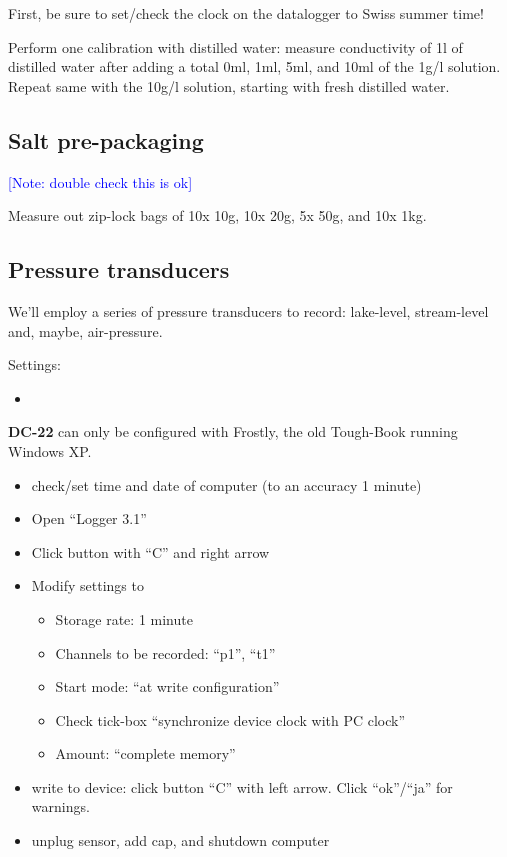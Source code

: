 \documentclass[DIV=15,halfparskip,11pt,headinclude]{scrartcl}
\newcommand{\note}[1]{\textcolor{blue}{[Note: #1]}}
\newcommand{\note}[1]{}
\begin{document}
First, be sure to set/check the clock on the datalogger to Swiss
summer time!

Perform one calibration with distilled water: measure conductivity of
1l of distilled water after adding a total 0ml, 1ml, 5ml, and 10ml of
the 1g/l solution.  Repeat same with the 10g/l solution, starting with
fresh distilled water.

\subsection{Salt pre-packaging}
\note{double check this is ok}

Measure out zip-lock bags of 10x 10g, 10x 20g, 5x 50g, and 10x 1kg.

\subsection{Pressure transducers}
\label{s:press-trans}

We'll employ a series of pressure transducers to record: lake-level,
stream-level and, maybe, air-pressure.

Settings:
\begin{itemize}
\item
\end{itemize}

\textbf{DC-22} can only be configured with Frostly, the old Tough-Book
running Windows XP.
\begin{itemize}
  \item check/set time and date of computer (to an accuracy 1 minute)
\item Open ``Logger 3.1''
\item Click button with ``C'' and right arrow
\item Modify settings to
\begin{itemize}
\item Storage rate: 1 minute
\item Channels to be recorded: ``p1'', ``t1''
\item Start mode: ``at write configuration''
\item Check tick-box ``synchronize device clock with PC clock''
\item Amount: ``complete memory''
\end{itemize}
\item write to device: click button ``C'' with left arrow.  Click
  ``ok''/``ja'' for warnings.
  \item unplug sensor, add cap, and shutdown computer
\end{itemize}
\end{document}
